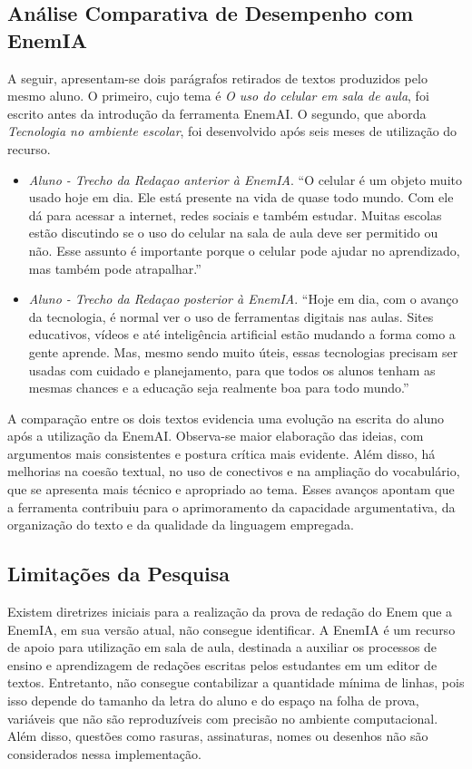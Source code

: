 \documentclass[portuguese]{textolivre}
\begin{document}
\subsection{\textbf{Análise Comparativa de Desempenho com EnemIA}}

A seguir, apresentam-se dois parágrafos retirados de textos produzidos pelo mesmo aluno. O primeiro, cujo tema é \textit{O uso do celular em sala de aula}, foi escrito antes da introdução da ferramenta EnemAI. O segundo, que aborda \textit{Tecnologia no ambiente escolar}, foi desenvolvido após seis meses de utilização do recurso.

\begin{itemize}
\item \emph{Aluno - Trecho da Redaçao anterior à EnemIA}. ``O celular é um objeto muito usado hoje em dia. Ele está presente na vida de quase todo mundo. Com ele dá para acessar a internet, redes sociais e também estudar. Muitas escolas estão discutindo se o uso do celular na sala de aula deve ser permitido ou não. Esse assunto é importante porque o celular pode ajudar no aprendizado, mas também pode atrapalhar.''

\item \emph{Aluno - Trecho da Redaçao posterior à EnemIA}. ``Hoje em dia, com o avanço da tecnologia, é normal ver o uso de ferramentas digitais nas aulas. Sites educativos, vídeos e até inteligência artificial estão mudando a forma como a gente aprende. Mas, mesmo sendo muito úteis, essas tecnologias precisam ser usadas com cuidado e planejamento, para que todos os alunos tenham as mesmas chances e a educação seja realmente boa para todo mundo.''
\end{itemize}

A comparação entre os dois textos evidencia uma evolução na escrita do aluno após a utilização da EnemAI. Observa-se maior elaboração das ideias, com argumentos mais consistentes e postura crítica mais evidente. Além disso, há melhorias na coesão textual, no uso de conectivos e na ampliação do vocabulário, que se apresenta mais técnico e apropriado ao tema. Esses avanços apontam que a ferramenta contribuiu para o aprimoramento da capacidade argumentativa, da organização do texto e da qualidade da linguagem empregada.

\subsection{\textbf{Limitações da Pesquisa}}

Existem diretrizes iniciais para a realização da prova de redação do Enem que a EnemIA, em sua versão atual, não consegue identificar. A EnemIA é um recurso de apoio para utilização em sala de aula, destinada a auxiliar os processos de ensino e aprendizagem de redações escritas pelos estudantes em um editor de textos. Entretanto, não consegue contabilizar a quantidade mínima de linhas, pois isso depende do tamanho da letra do aluno e do espaço na folha de prova, variáveis que não são reproduzíveis com precisão no ambiente computacional. Além disso, questões como rasuras, assinaturas, nomes ou desenhos não são considerados nessa implementação.
\end{document}
